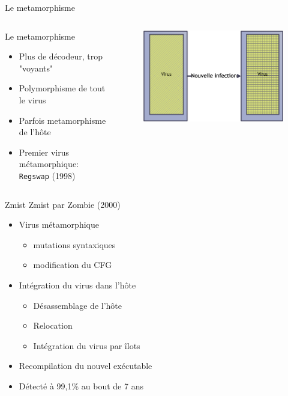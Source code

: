 \documentclass{beamer}
\begin{document}
\begin{frame}{Le metamorphisme}
\begin{columns}[t]
\begin{column}{5cm}
\begin{exampleblock}{Le metamorphisme}
\begin{itemize}
\item Plus de décodeur, trop "voyants"
\item Polymorphisme de tout le virus
\item Parfois metamorphisme de l'hôte
\item Premier virus métamorphique: \texttt{Regswap} (1998)
\end{itemize}
\end{exampleblock}
\end{column}
\begin{column}{5cm}
\begin{figure}[!ht]
\includegraphics[scale=0.31]{meta.png}
\center
\end{figure}
\end{column}
\end{columns}
\end{frame}

\begin{frame}{Zmist}
Zmist par Zombie (2000)
\begin{itemize}
\item Virus métamorphique 
\begin{itemize}
\item mutations syntaxiques
\item modification du CFG
\end{itemize}
\item Intégration du virus dans l'hôte
\begin{itemize}
\item Désassemblage de l'hôte
\item Relocation
\item Intégration du virus par îlots
\end{itemize}
\item Recompilation du nouvel exécutable
\item Détecté à 99,1\% au bout de 7 ans
\end{itemize}
\end{frame}
\end{document}
